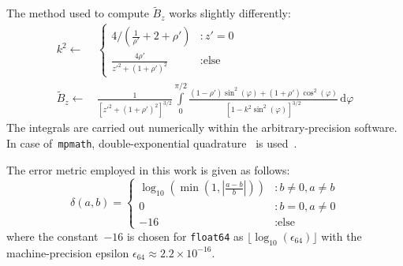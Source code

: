 The method used to compute $\tilde{B}_z$ works slightly differently:
\begin{align}
 k^2 \leftarrow&\,
  \begin{cases}
    4 / \left( \frac{1}{\rho'} + 2 + \rho' \right)    &: z' = 0 \\
    \frac{4 \rho'}{{z'}^2 + \left(1 + \rho'\right)^2} &: \textrm{else}
  \end{cases} \nonumber \\
 \tilde{B}_z \leftarrow&\,
   \frac{1}{\left[ {z'}^2 + \left(1 + \rho'\right)^2 \right]^{3/2} }
                                 \int\limits_0^{\pi/2}
                                   \frac{(1-\rho') \sin^2(\varphi) + (1+\rho') \cos^2(\varphi)}
                                        {\left[1 - k^2 \sin^2(\varphi) \right]^{3/2}} \,\mathrm{d}\varphi
\end{align}
The integrals are carried out numerically within the arbitrary-precision software.
In case of~\texttt{mpmath}, double-exponential quadrature~\cite{double_exp_quad} is used~\cite{mpmath_quad}.

The error metric employed in this work is given as follows:
\begin{equation}
 \delta(a, b)
 = \begin{cases}
    \log_{10} \left(\min\left(1, \left| \frac{a - b}{b} \right|\right) \right) &: b \neq 0, a \neq b \\
    0                                                                          &: b=0, a \neq 0 \\
    -16                                                                        &: \textrm{else}
   \end{cases}
\end{equation}
where the constant~$-16$ is chosen for \texttt{float64} as $\lfloor \log_{10}(\epsilon_{64}) \rfloor$
with  the machine-precision epsilon $\epsilon_{64} \approx 2.2 \times 10^{-16}$.

